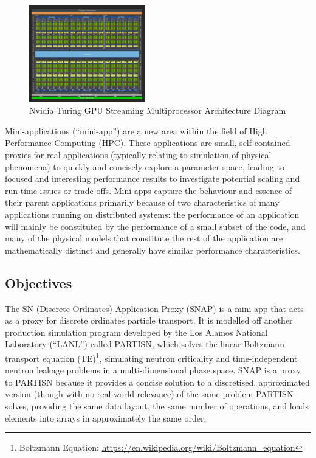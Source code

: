\documentclass[conference]{IEEEtran}
\begin{document}
\begin{figure}
\centering
\includegraphics[width=0.45\textwidth]{images/gpu_diagram.jpg}
\caption{Nvidia Turing GPU Streaming Multiprocessor Architecture Diagram}
\label{fig:gpu_diagram}
\end{figure}

Mini-applications (``mini-app”) are a new area within the field of High Performance Computing (HPC). These applications are small, self-contained proxies for real applications (typically relating to simulation of physical phenomena) to quickly and concisely explore a parameter space, leading to focused and interesting performance results to investigate potential scaling and run-time issues or trade-offs\cite{miniapps}. Mini-apps capture the behaviour and essence of their parent applications primarily because of two characteristics of many applications running on distributed systems: the performance of an application will mainly be constituted by the performance of a small subset of the code, and many of the physical models that constitute the rest of the application are mathematically distinct and generally have similar performance characteristics\cite{miniapps}.

\subsection{Objectives}

The SN (Discrete Ordinates) Application Proxy (SNAP) is a mini-app that acts as a proxy for discrete ordinates particle transport. It is modelled off another production simulation program developed by the Los Alamos National Laboratory (``LANL'') called PARTISN, which solves the linear Boltzmann transport equation (TE)\footnote{Boltzmann Equation: \url{https://en.wikipedia.org/wiki/Boltzmann_equation}\raggedright}, simulating neutron criticality and time-independent neutron leakage problems\cite{partisn} in a multi-dimensional phase space. SNAP is a proxy to PARTISN because it provides a concise solution to a discretised, approximated version (though with no real-world relevance) of the same problem PARTISN solves, providing the same data layout, the same number of operations, and loads elements into arrays in approximately the same order.
\end{document}
